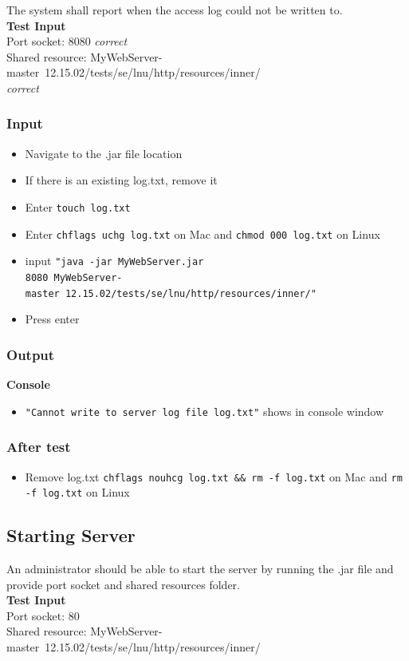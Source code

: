 \documentclass[a4paper, 12pt]{article}
\begin{document}
The system shall report when the access log could not be written to.\\
\textbf{Test Input} \\ Port socket: 8080 \textit{correct} \\ Shared resource: MyWebServer-master\ 12.15.02/tests/se/lnu/http/resources/inner/ \\ \textit{correct}
 
\subsubsection{Input}
\begin{itemize}
\item Navigate to the .jar file location
\item If there is an existing log.txt, remove it
\item Enter \texttt{touch log.txt}
\item Enter \texttt{chflags uchg log.txt} on Mac and \texttt{chmod 000 log.txt} on Linux
\item input \texttt{"java -jar MyWebServer.jar \\ 8080 MyWebServer-master\ 12.15.02/tests/se/lnu/http/resources/inner/"}
\item Press enter
\end{itemize} 

\subsubsection{Output}
\textbf{Console}
\begin{itemize}
\item \texttt{"Cannot write to server log file log.txt"} shows in console window
\end{itemize}

\subsubsection{After test}
\begin{itemize}
\item Remove log.txt \texttt{chflags nouhcg log.txt \&\& rm -f log.txt} on Mac and \texttt{rm -f log.txt} on Linux
\end{itemize}

\subsection{Starting Server}

An administrator should be able to start the server by running the .jar file and provide port socket and shared resources folder.\\
\textbf{Test Input} \\ Port socket: 80 \\ Shared resource: MyWebServer-master\ 12.15.02/tests/se/lnu/http/resources/inner/
\end{document}
